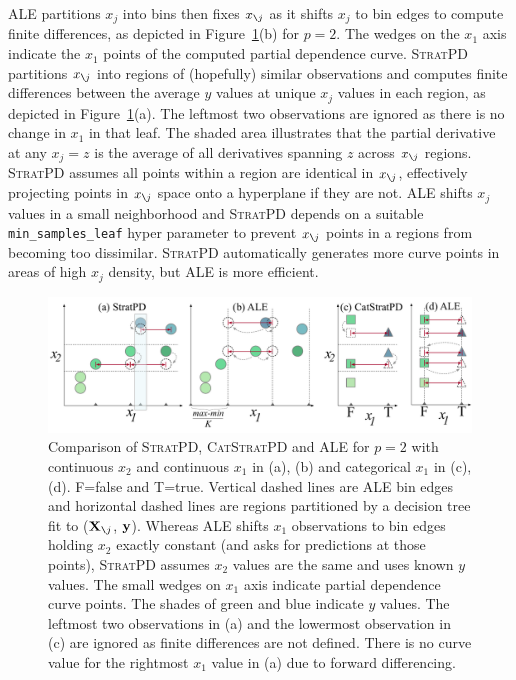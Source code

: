 \documentclass[]{article} %
\newcommand{\figref}[1]{Figure~\ref{#1}}
\newcommand{\spd}{\fontfamily{cmr}\textsc{\small StratPD}}
\newcommand{\cspd}{\fontfamily{cmr}\textsc{\small CatStratPD}}
\newcommand{\Xnj}{${\bf X}_{\texttt{\char`\\} j}$}
\newcommand{\xnj}{$x_{\texttt{\char`\\} j}$}
\begin{document}
ALE partitions $x_j$ into bins then fixes \xnj{} as it shifts $x_j$ to bin edges to compute finite differences, as depicted in \figref{fig:partitioning}(b) for $p=2$. The wedges on the $x_1$ axis indicate the $x_1$ points of the computed partial dependence curve.  \spd{} partitions \xnj{} into regions of (hopefully) similar observations and computes finite differences between the average $y$ values at unique $x_j$ values in each region, as depicted in \figref{fig:partitioning}(a).  The leftmost two observations are ignored as there is no change in $x_1$ in that leaf. The shaded area illustrates that the partial derivative at any $x_j=z$ is the average of all derivatives spanning $z$ across \xnj{} regions.  \spd{} assumes all points within a region are identical in \xnj{}, effectively projecting points in \xnj{} space onto a hyperplane if they are not.  ALE shifts $x_j$ values in a small neighborhood and \spd{} depends on a suitable {\tt\small min\_samples\_leaf}  hyper parameter to prevent \xnj{} points in a regions from becoming too dissimilar.  \spd{} automatically generates more curve points in areas of high $x_j$ density, but ALE is more efficient.

\begin{figure}[!htbp]
\begin{center}
\includegraphics[scale=.4]{images/partitioning.pdf}\vspace{-3mm}
\caption{\small Comparison of \spd, \cspd{} and ALE for $p=2$ with continuous $x_2$ and continuous $x_1$ in (a), (b) and  categorical $x_1$ in (c), (d).  F=false and T=true. Vertical dashed lines are ALE bin edges and horizontal dashed lines are regions partitioned by a decision tree fit to (\Xnj, ${\bf y}$). Whereas ALE shifts $x_1$ observations to bin edges holding $x_2$ exactly constant (and asks for predictions at those points), \spd{} assumes $x_2$ values are the same and uses known $y$ values. The small wedges on $x_1$ axis indicate partial dependence curve points.  The shades of green and blue indicate $y$ values. The leftmost two observations in (a) and the lowermost observation in (c) are ignored as finite differences are not defined. There is no curve value for the rightmost $x_1$ value in (a) due to forward differencing.}
\label{fig:partitioning}
\end{center}
\end{figure}
\end{document}
